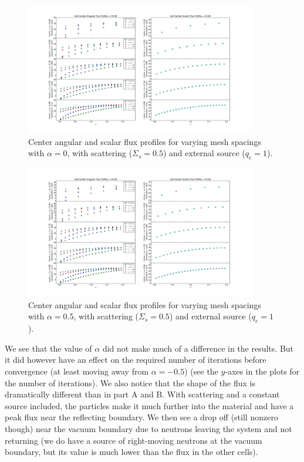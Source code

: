 \documentclass[10pt]{article}
\begin{document}
\begin{figure}[H]
    \centering
    \includegraphics[width=0.9\textwidth]{Figures/FluxProfile_a=0_source}
    \caption{Center angular and scalar flux profiles for varying mesh spacings with $\alpha = 0$, with scattering ($\Sigma_s = 0.5$) and external source ($q_e=1$).}
    \label{fig9}
\end{figure}

\begin{figure}[H]
    \centering
    \includegraphics[width=0.9\textwidth]{Figures/FluxProfile_a=05_source}
    \caption{Center angular and scalar flux profiles for varying mesh spacings with $\alpha = 0.5$, with scattering ($\Sigma_s = 0.5$) and external source ($q_e=1$).}
    \label{fig10}
\end{figure}

\newpage
We see that the value of $\alpha$ did not make much of a difference in the results. But it did however have an effect on the required number of iterations before convergence (at least moving away from $\alpha = -0.5$) (see the $y$-axes in the plots for the number of iterations). We also notice that the shape of the flux is dramatically different than in part A and B. With scattering and a constant source included, the particles make it much further into the material and have a peak flux near the reflecting boundary. We then see a drop off (still nonzero though) near the vacuum boundary due to neutrons leaving the system and not returning (we do have a source of right-moving neutrons at the vacuum boundary, but its value is much lower than the flux in the other cells). 
\end{document}
